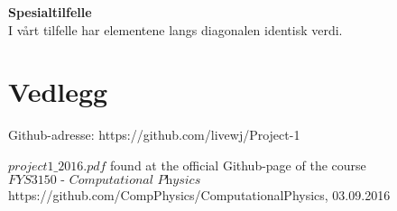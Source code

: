 \documentclass{article}
\begin{document}
\textbf{Spesialtilfelle}\\
I vårt tilfelle har elementene langs diagonalen identisk verdi.





\section{Vedlegg}
Github-adresse: https://github.com/livewj/Project-1

%




\begin{thebibliography}{9}

  $project1\_2016.pdf$
  found at the official Github-page of the course $\textit{FYS3150 - Computational Physics}$
  https://github.com/CompPhysics/ComputationalPhysics,
  03.09.2016
  
    
\end{thebibliography}
\end{document}
